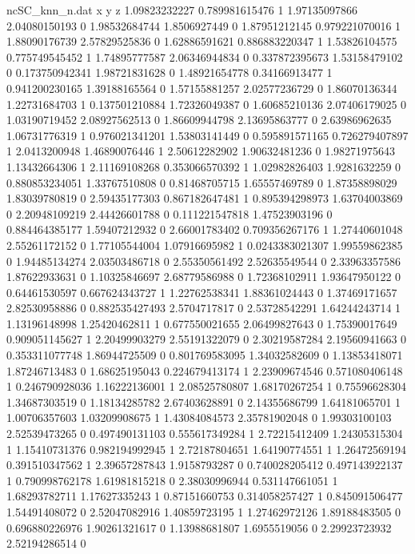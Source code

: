 \begin{filecontents}{ncSC_knn_n.dat}
x y z
1.09823232227 0.789981615476 1
1.97135097866 2.04080150193 0
1.98532684744 1.8506927449 0
1.87951212145 0.979221070016 1
1.88090176739 2.57829525836 0
1.62886591621 0.886883220347 1
1.53826104575 0.775749545452 1
1.74895777587 2.06346944834 0
0.337872395673 1.53158479102 0
0.173750942341 1.98721831628 0
1.48921654778 0.34166913477 1
0.941200230165 1.39188165564 0
1.57155881257 2.02577236729 0
1.86070136344 1.22731684703 1
0.137501210884 1.72326049387 0
1.60685210136 2.07406179025 0
1.03190719452 2.08927562513 0
1.86609944798 2.13695863777 0
2.63986962635 1.06731776319 1
0.976021341201 1.53803141449 0
0.595891571165 0.726279407897 1
2.0413200948 1.46890076446 1
2.50612282902 1.90632481236 0
1.98271975643 1.13432664306 1
2.11169108268 0.353066570392 1
1.02982826403 1.9281632259 0
0.880853234051 1.33767510808 0
0.81468705715 1.65557469789 0
1.87358898029 1.83039780819 0
2.59435177303 0.867182647481 1
0.895394298973 1.63704003869 0
2.20948109219 2.44426601788 0
0.111221547818 1.47523903196 0
0.884464385177 1.59407212932 0
2.66001783402 0.709356267176 1
1.27440601048 2.55261172152 0
1.77105544004 1.07916695982 1
0.0243383021307 1.99559862385 0
1.94485134274 2.03503486718 0
2.55350561492 2.52635549544 0
2.33963357586 1.87622933631 0
1.10325846697 2.68779586988 0
1.72368102911 1.93647950122 0
0.64461530597 0.667624343727 1
1.22762538341 1.88361024443 0
1.37469171657 2.82530958886 0
0.882535427493 2.5704717817 0
2.53728542291 1.64244243714 1
1.13196148998 1.25420462811 1
0.677550021655 2.06499827643 0
1.75390017649 0.909051145627 1
2.20499903279 2.55191322079 0
2.30219587284 2.19560941663 0
0.353311077748 1.86944725509 0
0.801769583095 1.34032582609 0
1.13853418071 1.87246713483 0
1.68625195043 0.224679413174 1
2.23909674546 0.571080406148 1
0.246790928036 1.16222136001 1
2.08525780807 1.68170267254 1
0.75596628304 1.34687303519 0
1.18134285782 2.67403628891 0
2.14355686799 1.64181065701 1
1.00706357603 1.03209908675 1
1.43084084573 2.35781902048 0
1.99303100103 2.52539473265 0
0.497490131103 0.555617349284 1
2.72215412409 1.24305315304 1
1.15410731376 0.982194992945 1
2.72187804651 1.64190774551 1
1.26472569194 0.391510347562 1
2.39657287843 1.9158793287 0
0.740028205412 0.497143922137 1
0.790998762178 1.61981815218 0
2.38030996944 0.531147661051 1
1.68293782711 1.17627335243 1
0.87151660753 0.314058257427 1
0.845091506477 1.54491408072 0
2.52047082916 1.40859723195 1
1.27462972126 1.89188483505 0
0.696880226976 1.90261321617 0
1.13988681807 1.6955519056 0
2.29923723932 2.52194286514 0

\end{filecontents}
